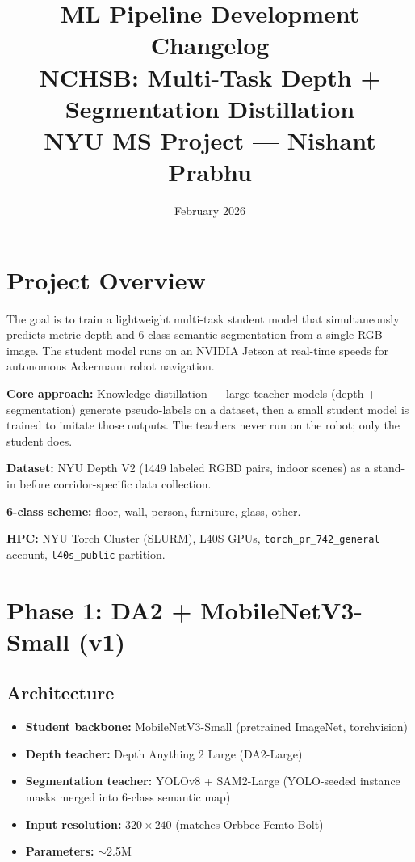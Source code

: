 \documentclass[11pt,a4paper]{article}
\title{%
  \textbf{ML Pipeline Development Changelog} \\[0.5em]
  \large NCHSB: Multi-Task Depth + Segmentation Distillation \\[0.3em]
  \normalsize NYU MS Project --- Nishant Prabhu
}
\author{}
\date{February 2026}
\begin{document}
\maketitle
\tableofcontents
\newpage

\section{Project Overview}

The goal is to train a lightweight multi-task student model that simultaneously
predicts metric depth and 6-class semantic segmentation from a single RGB image.
The student model runs on an NVIDIA Jetson at real-time speeds for autonomous
Ackermann robot navigation.

\textbf{Core approach:} Knowledge distillation --- large teacher models
(depth + segmentation) generate pseudo-labels on a dataset, then a small
student model is trained to imitate those outputs. The teachers never run
on the robot; only the student does.

\textbf{Dataset:} NYU Depth V2 (1449 labeled RGBD pairs, indoor scenes)
as a stand-in before corridor-specific data collection.

\textbf{6-class scheme:} floor, wall, person, furniture, glass, other.

\textbf{HPC:} NYU Torch Cluster (SLURM), L40S GPUs,
\texttt{torch\_pr\_742\_general} account, \texttt{l40s\_public} partition.

\section{Phase 1: DA2 + MobileNetV3-Small (v1)}
\label{sec:phase1}

\subsection{Architecture}

\begin{itemize}[nosep]
  \item \textbf{Student backbone:} MobileNetV3-Small (pretrained ImageNet, torchvision)
  \item \textbf{Depth teacher:} Depth Anything 2 Large (DA2-Large)
  \item \textbf{Segmentation teacher:} YOLOv8 + SAM2-Large (YOLO-seeded instance masks merged into 6-class semantic map)
  \item \textbf{Input resolution:} $320 \times 240$ (matches Orbbec Femto Bolt)
  \item \textbf{Parameters:} $\sim$2.5M
\end{itemize}
\end{document}
